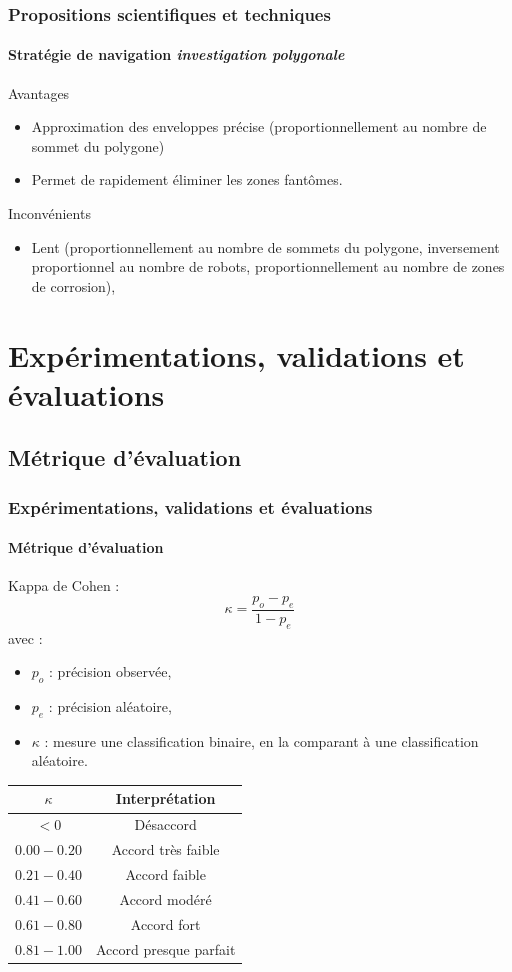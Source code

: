 \documentclass{beamer}
\begin{document}
			\begin{frame}
				\frametitle{Propositions scientifiques et techniques}
				\framesubtitle{Stratégie de navigation \textit{investigation polygonale}}
				\begin{exampleblock}{Avantages}
					\begin{itemize}
						\item Approximation des enveloppes précise (proportionnellement au nombre de sommet du polygone)
						\item Permet de rapidement éliminer les zones fantômes.
					\end{itemize}
				\end{exampleblock}
				\begin{alertblock}{Inconvénients}
					\begin{itemize}
						\item Lent (proportionnellement au nombre de sommets du polygone, inversement proportionnel au nombre de robots, proportionnellement au nombre de zones de corrosion),
					\end{itemize}
				\end{alertblock}
			\end{frame}
	\section{Expérimentations, validations et évaluations}
		\subsection{Métrique d'évaluation}
			\begin{frame}
				\frametitle{Expérimentations, validations et évaluations}
				\framesubtitle{Métrique d'évaluation}
				Kappa de Cohen :
				\begin{equation*}
					\kappa = \frac{p_o - p_e}{1 - p_e}
				\end{equation*}
				avec :
				\begin{itemize}
					\item $p_o$ : précision observée,
					\item $p_e$ : précision aléatoire,
					\item $\kappa$ : mesure une classification binaire, en la comparant à une classification aléatoire.
				\end{itemize}
				\begin{table}
					\centering
					\begin{tabular}{|c|c|}
						\hline
						$\kappa$ & Interprétation \\
						\hline
						$< 0$ & Désaccord \\
						\hline
						$0.00 - 0.20$ & Accord très faible \\
						\hline
						$0.21 - 0.40$ & Accord faible \\
						\hline
						$0.41 - 0.60$ & Accord modéré \\
						\hline
						$0.61 - 0.80$ & Accord fort \\
						\hline
						$0.81 - 1.00$ & Accord presque parfait \\
						\hline
					\end{tabular}
				\end{table}
			\end{frame}
\end{document}
